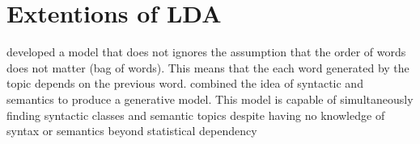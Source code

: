 \section{Extentions of LDA}
\cite{wallach2006topic} developed a model that does not ignores the assumption that the order of words does not matter (bag of words). This means that the each word generated by the topic depends on the previous word. 
\cite{griffiths2007topics} combined the idea of syntactic and semantics to produce a generative model. This model  is capable of simultaneously finding syntactic classes and semantic topics despite having no knowledge of syntax or semantics beyond statistical dependency
%
%
%
